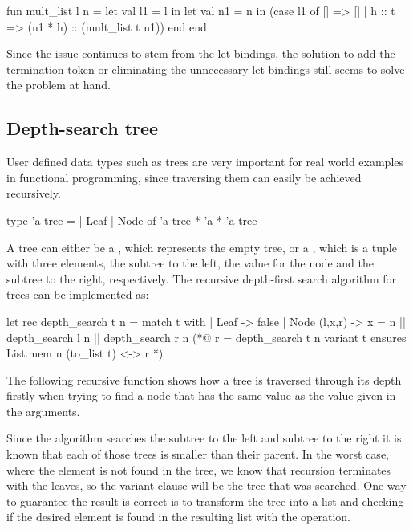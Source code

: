 \begin{cakeml}
fun mult_list l n = let val l1 = l in
    let val n1 = n in
    (case l1 of
        [] => []
    | h :: t => (n1 * h) :: (mult_list t n1))
    end end
\end{cakeml}

Since the issue continues to stem from the let-bindings, the solution to add the termination token or eliminating the unnecessary 
let-bindings still seems to solve the problem at hand.

\subsection{Depth-search tree}

User defined data types such as trees are very important for real world examples in functional programming, since traversing them
can easily be achieved recursively. 

\begin{gospell}
type 'a tree =
    | Leaf
    | Node of 'a tree * 'a * 'a tree
\end{gospell}

A tree can either be a , which represents the empty tree, or a , which is a tuple with three elements, 
the subtree to the left, the value for the node and the subtree to the right, respectively. The recursive depth-first search algorithm 
for trees can be implemented as:

\begin{gospell}
let rec depth_search t n = 
  match t with
  | Leaf -> false
  | Node (l,x,r) -> x = n || depth_search l n || depth_search r n
(*@
  r = depth_search t n
  variant t
  ensures List.mem n (to_list t) <-> r
*)
\end{gospell}

The following recursive function  shows how a tree is traversed through its depth firstly when trying to find
a node that has the same value as the value given in the arguments.

Since the algorithm searches the subtree to the left and subtree to the right it is known that each of those trees is smaller than their
parent. In the worst case, where the element is not found in the tree, we know that recursion terminates with the leaves, so the variant 
clause will be the tree that was searched. One way to guarantee the result is correct is to transform the tree into a list and checking if
the desired element is found in the resulting list with the  operation.

